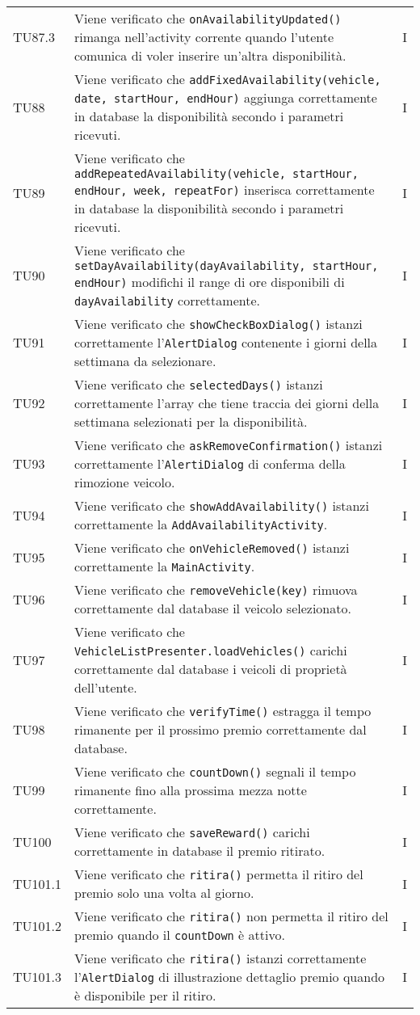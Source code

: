 \begin{longtable}{ >{\centering}p{}  >{\centering}p{} >{\centering}p{}
			}
		\tabularnewline	
		TU87.3 & Viene verificato che \texttt{onAvailabilityUpdated()} rimanga nell'activity corrente quando l'utente comunica di voler inserire un'altra disponibilità. & I
		\tabularnewline	
		TU88 & Viene verificato che \texttt{addFixedAvailability(vehicle, date, startHour, endHour)} aggiunga correttamente in database la disponibilità secondo i parametri ricevuti. & I 
		\tabularnewline	
		TU89 & Viene verificato che \texttt{addRepeatedAvailability(vehicle, startHour, endHour, week, repeatFor)} inserisca correttamente in database la disponibilità secondo i parametri ricevuti. & I 
		\tabularnewline	
		TU90 & Viene verificato che \texttt{setDayAvailability(dayAvailability, startHour, endHour)} modifichi il range di ore disponibili di \texttt{dayAvailability} correttamente. & I 
		\tabularnewline	
		TU91 & Viene verificato che \texttt{showCheckBoxDialog()} istanzi correttamente l'\texttt{AlertDialog} contenente i giorni della settimana da selezionare. & I 
		\tabularnewline	
		TU92 & Viene verificato che \texttt{selectedDays()} istanzi correttamente l'array che tiene traccia dei giorni della settimana selezionati per la disponibilità. & I 
		\tabularnewline	
		TU93 & Viene verificato che \texttt{askRemoveConfirmation()} istanzi correttamente l'\texttt{AlertiDialog} di conferma della rimozione veicolo. & I
		\tabularnewline	
		TU94 & Viene verificato che \texttt{showAddAvailability()} istanzi correttamente la \texttt{AddAvailabilityActivity}. & I 
		\tabularnewline	
		TU95 & Viene verificato che \texttt{onVehicleRemoved()} istanzi correttamente la \texttt{MainActivity}. & I 
		\tabularnewline	
		TU96 & Viene verificato che \texttt{removeVehicle(key)} rimuova correttamente dal database il veicolo selezionato. & I 
		\tabularnewline	
		TU97 & Viene verificato che \texttt{VehicleListPresenter.loadVehicles()} carichi correttamente dal database i veicoli di proprietà dell'utente. & I
		\tabularnewline	
		TU98 & Viene verificato che \texttt{verifyTime()} estragga il tempo rimanente per il prossimo premio correttamente dal database. & I 
		\tabularnewline	
		TU99 & Viene verificato che \texttt{countDown()} segnali il tempo rimanente fino alla prossima mezza notte correttamente. & I 
		\tabularnewline	
		TU100 & Viene verificato che \texttt{saveReward()} carichi correttamente in database il premio ritirato. & I 
		\tabularnewline	
		TU101.1 & Viene verificato che \texttt{ritira()} permetta il ritiro del premio solo una volta al giorno. & I 
		\tabularnewline	
		TU101.2 & Viene verificato che \texttt{ritira()} non permetta il ritiro del premio quando il \texttt{countDown} è attivo. & I 
		\tabularnewline	
		TU101.3 & Viene verificato che \texttt{ritira()} istanzi correttamente l'\texttt{AlertDialog} di illustrazione dettaglio premio quando è disponibile per il ritiro. & I 
		

\end{longtable}
